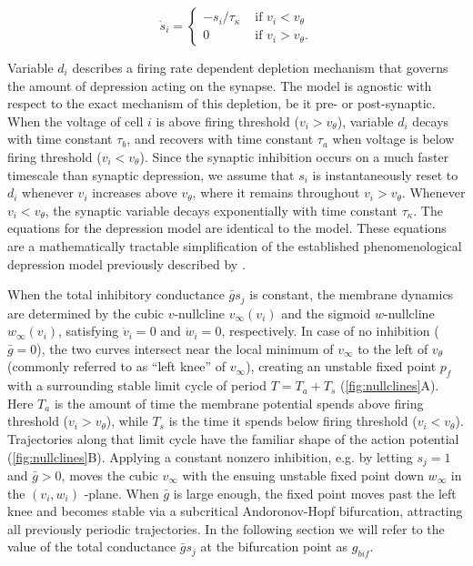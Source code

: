 \documentclass[utf8]{frontiersFPHY} %
\begin{document}
\begin{equation}
	\label{eq:dot-s}
	\dot s_{i} = \begin{cases}
		-s_{i} / \tau_{\kappa} & \text{ if } v_{i}<v_{\theta}  \\
		0                      & \text{ if } v_{i}>v_{\theta}.
	\end{cases}
\end{equation}

Variable $d_{i}$ describes a firing rate dependent depletion mechanism that governs the amount of depression acting on the synapse.
The model is agnostic with respect to the exact mechanism of this depletion, be it pre- or post-synaptic.
When the voltage of cell $i$ is above firing threshold ($v_i>v_\theta$), variable $d_i$ decays with time constant $\tau_b$, and recovers with time constant $\tau_a$ when voltage is below firing threshold ($v_i < v_\theta$).
Since the synaptic inhibition occurs on a much faster timescale than synaptic depression, we assume that $s_i$ is instantaneously reset to $d_i$ whenever $v_i$ increases above $v_\theta$, where it remains throughout $v_i > v_\theta$.
Whenever $v_i < v_\theta$, the synaptic variable decays exponentially with time constant $\tau_\kappa$.
The equations for the depression model are identical to the \citet{bose2001} model.
These equations are a mathematically tractable simplification of the established phenomenological depression model previously described by \citet{tsodyks1997}.

When the total inhibitory conductance $\bar g s_{j}$ is constant, the membrane dynamics are determined by the cubic $v$-nullcline $v_{\infty}(v_i)$ and the sigmoid $w$-nullcline $w_{\infty}(v_{i})$, satisfying $\dot v_{i}=0$ and $\dot w_{i}=0$, respectively.
In case of no inhibition ($\bar g=0$), the two curves intersect near the local minimum of $v_{\infty}$ to the left of $v_{\theta}$ (commonly referred to as ``left knee'' of $v_{\infty}$), creating an unstable fixed point $p_{f}$ with a surrounding stable limit cycle of period $T=T_{a}+T_{s}$ (\cref{fig:nullclines}A).
Here $T_{a}$ is the amount of time the membrane potential spends above firing threshold ($v_{i}>v_\theta$), while $T_{s}$ is the time it spends below firing threshold ($v_{i}<v_\theta$). Trajectories along that limit cycle have the familiar shape of the action potential (\cref{fig:nullclines}B).
Applying a constant nonzero inhibition, e.g. by letting $s_{j}=1$ and $\bar g > 0$, moves the cubic $v_{\infty}$ with the ensuing unstable fixed point down $w_{\infty}$ in the $(v_{i}, w_{i})$ -plane.
When $\bar g$ is large enough, the fixed point moves past the left knee and becomes stable via a subcritical Andoronov-Hopf bifurcation, attracting all previously periodic trajectories.
In the following section we will refer to the value of the total conductance $\bar g s_{j}$ at the bifurcation point as $g_{bif}$.
\end{document}
